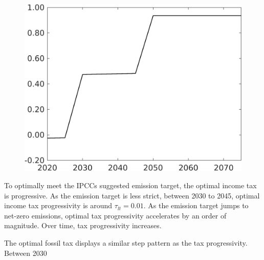 \begin{figure}[h!!]
\begin{minipage}[]{0.4\textwidth}
		\includegraphics[width=1\textwidth]{../../codding_model/own_basedOnFried/optimalPol_elastS_DisuSci/figures/all_1705/Single_OPT_T_NoTaus_tauf_spillover0_sep1_BN0_ineq0_etaa0.79.png}
	\end{minipage}
\end{figure} 

To optimally meet the IPCCs suggested emission target, the optimal income tax is progressive. As the emission target is less strict, between 2030 to 2045, optimal income tax progressivity is around $\tau_{lt}=0.01$. As the emission target jumps to net-zero emissions, optimal tax progressivity accelerates by an order of magnitude. Over time, tax progressivity increases.  

The optimal fossil tax displays a similar step pattern as the tax progressivity. Between 2030

